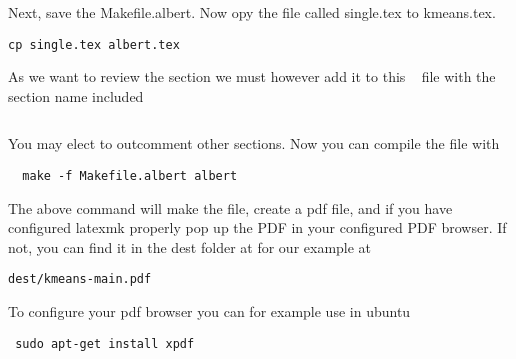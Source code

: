 Next, save the Makefile.albert.
Now opy the file called single.tex to kmeans.tex. 

\begin{lstlisting}
cp single.tex albert.tex
\end{lstlisting}

As we want to review the section we must however  add it to this \LaTex~
file with the section name included

\begin{lstlisting}

\end{lstlisting}

You may elect to outcomment other sections.
Now you can compile the file with 

\begin{lstlisting}
  make -f Makefile.albert albert
\end{lstlisting}


The above command will make the file, create a pdf file, and if you
have configured latexmk properly pop up the PDF in your configured PDF
browser. If not, you can find it in the dest folder at for our example
at 

\begin{lstlisting}
dest/kmeans-main.pdf
\end{lstlisting}


To configure your pdf browser you can for example use in ubuntu

\begin{lstlisting}
 sudo apt-get install xpdf
\end{lstlisting}


